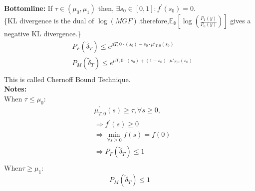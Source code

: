 \documentclass[a4paper,english,12pt]{article}
\begin{document}
\textbf{Bottomline:}
If $\tau\in(\mu_0,\mu_1)$ then, $\exists s_0\in[0,1]:f^\prime(s_0)=0$.\\
\{KL divergence is the dual of $\log(MGF)$.therefore,$\mathbb{E_0}\left[\log\left(\frac{P_1(y)}{P_0(y)}\right)\right]$ gives a negative KL divergence.\}\\
\begin{align}
&P_F(\tilde\delta_T)\leq e^{\mu{T,0}\cdot (s_0)-s_0 \cdot \mu \prime_{T,0}(s_0)}\\
&P_M(\tilde\delta_T)\leq e^{\mu{T,0}\cdot (s_0)+(1-s_0) \cdot \mu \prime_{T,0}(s_0)}\\
\end{align}
This is called Chernoff Bound Technique.\\
\textbf{Notes:}\\
When $\tau\leq \mu_0$:
\begin{align*}
&\mu^\prime_{T,0}(s)\geq \tau,\forall s\geq 0,\\
&\Rightarrow f^\prime(s)\geq 0\\
&\Rightarrow\min_{\forall s \geq 0}{f(s)}=f(0)\\
&\Rightarrow P_F(\tilde\delta_T) \leq 1\\
\end{align*}
When$\tau\geq\mu_1:$\\
\[P_M(\tilde\delta_T)\leq 1\]
\end{document}
